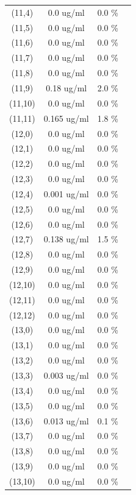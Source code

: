 \documentclass{article}
\begin{document}
\begin{tabular}{c c c c}
(11,4)&        0.0 ug/ml        &0.0 \%\\
(11,5)&        0.0 ug/ml        &0.0 \%\\
(11,6)&        0.0 ug/ml        &0.0 \%\\
(11,7)&        0.0 ug/ml        &0.0 \%\\
(11,8)&        0.0 ug/ml        &0.0 \%\\
(11,9)&        0.18 ug/ml        &2.0 \%\\
(11,10)&        0.0 ug/ml        &0.0 \%\\
(11,11)&        0.165 ug/ml        &1.8 \%\\
(12,0)&        0.0 ug/ml        &0.0 \%\\
(12,1)&        0.0 ug/ml        &0.0 \%\\
(12,2)&        0.0 ug/ml        &0.0 \%\\
(12,3)&        0.0 ug/ml        &0.0 \%\\
(12,4)&        0.001 ug/ml        &0.0 \%\\
(12,5)&        0.0 ug/ml        &0.0 \%\\
(12,6)&        0.0 ug/ml        &0.0 \%\\
(12,7)&        0.138 ug/ml        &1.5 \%\\
(12,8)&        0.0 ug/ml        &0.0 \%\\
(12,9)&        0.0 ug/ml        &0.0 \%\\
(12,10)&        0.0 ug/ml        &0.0 \%\\
(12,11)&        0.0 ug/ml        &0.0 \%\\
(12,12)&        0.0 ug/ml        &0.0 \%\\
(13,0)&        0.0 ug/ml        &0.0 \%\\
(13,1)&        0.0 ug/ml        &0.0 \%\\
(13,2)&        0.0 ug/ml        &0.0 \%\\
(13,3)&        0.003 ug/ml        &0.0 \%\\
(13,4)&        0.0 ug/ml        &0.0 \%\\
(13,5)&        0.0 ug/ml        &0.0 \%\\
(13,6)&        0.013 ug/ml        &0.1 \%\\
(13,7)&        0.0 ug/ml        &0.0 \%\\
(13,8)&        0.0 ug/ml        &0.0 \%\\
(13,9)&        0.0 ug/ml        &0.0 \%\\
(13,10)&        0.0 ug/ml        &0.0 \%\\

\end{tabular}
\end{document}
